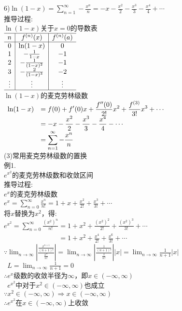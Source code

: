6)\quad$\displaystyle\ln(1-x)=\sum_{n=1}^{\infty}-\frac{x^n}{n}=-x-\frac{x^2}{2}-\frac{x^3}{3}-\frac{x^4}{4}+\cdots$\\[2ex]
推导过程:\\
$\ln(1-x)$关于$x=0$的导数表\\[1ex]
$\begin{array}{c|c|c}
\hline
n & f^{(n)}(x) & f^{(n)}(a)\\
\hline
0 & \ln(1-x) & 0\\
1 & -\frac{1}{1-x} & -1\\
2 & -\frac{1}{(1-x)^2} & -1\\
3 & -\frac{2}{(1-x)^3} & -2\\
\vdots & \vdots & \vdots\\
\hline
\end{array}$\\[1ex]
$\ln(1-x)$的麦克劳林级数\\
$\begin{array}{>{\displaystyle}r >{\displaystyle}l}
\ln(1-x) & =f(0)+f'(0)x+\frac{f''(0)}{2!}x^2+\frac{f^{(3)}}{3!}x^3+\cdots\\
& =-x-\frac{x^2}{2}-\frac{x^3}{3}-\frac{x^4}{4}-\cdots\\
& =\sum_{n=1}^{\infty}-\frac{x^n}{n}
\end{array}$\\[2ex]

(3)常用麦克劳林级数的置换\\
例1.\\
\quad$\displaystyle e^{x^2}$的麦克劳林级数和收敛区间\\
推导过程:\\
$e^x$的麦克劳林级数\\
$\displaystyle e^x=\sum_{n=0}^{\infty}\frac{x^n}{n!}=1+x+\frac{x^2}{2!}+\frac{x^3}{3!}+\cdots$\\
将$x$替换为$x^2$，得:\\
$\displaystyle e^{x^2}=\sum_{n=0}^{\infty}\frac{(x^2)^n}{n!}=1+x^2+\frac{(x^2)^2}{2!}+\frac{(x^2)^3}{3!}+\cdots$\\
$\phantom{\displaystyle e^{x^2}=\sum_{n=0}^{\infty}\frac{(x^2)^n}{n!}}\displaystyle =1+x^2+\frac{x^4}{2!}+\frac{x^6}{3!}+\cdots$\\
$\because\displaystyle\lim_{n\to\infty}|\frac{\frac{x^{n+1}}{(n+1)!}}{\frac{x^n}{n!}}|=\lim_{n\to\infty}\left|\frac{\frac{1}{(n+1)!}}{\frac{1}{n!}}\right||x|=\lim_{n\to\infty}\frac{1}{n+1}|x|$\\
$\phantom{\because}\displaystyle L=\lim_{n\to\infty}\frac{1}{n+1}=0$\\
$\therefore e^x$级数的收敛半径为$\infty$，即$x\in(-\infty,\infty)$\\
$\phantom{\therefore}e^{x^2}$中对于$x^2\in(-\infty,\infty)$也成立\\
$\because x^2\in(-\infty,\infty)\Rightarrow x\in(-\infty,\infty)$\\
$\therefore e^{x^2}$在$x\in(-\infty,\infty)$上收敛\\[2ex]

